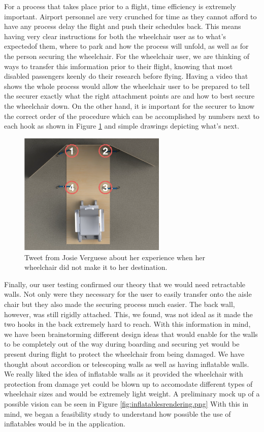 For a process that takes place prior to a flight, time efficiency is extremely important. Airport personnel are very crunched for time as they cannot afford to have any process delay the flight and push their schedules back. This means having very clear instructions for both the wheelchair user as to what's expectedof them, where to park and how the process will unfold, as well as for the person securing the wheelchair. For the wheelchair user, we are thinking of ways to transfer this imformation prior to their flight, knowing that most disabled passengers keenly do their research before flying. Having a video that shows the whole process would allow the wheelchair user to be prepared to tell the securer exactly what the right attachment points are and how to best secure the wheelchair down. On the other hand, it is important for the securer to know the correct order of the procedure which can be accomplished by numbers next to each hook as shown in Figure \ref{fig:instructionsstorage.png} and simple drawings depicting what's next. 

\begin{figure}[h]
  \centering
     \includegraphics[width=7cm]{images/instructionsstorage.png}
   \caption{Tweet from Josie Verguese about her experience when her wheelchair did not make it to her destination.}
  \label{fig:instructionsstorage.png}
\end{figure}

Finally, our user testing confirmed our theory that we would need retractable walls. Not only were they necessary for the user to easily transfer onto the aisle chair but they also made the securing process much easier. The back wall, however, was still rigidly attached. This, we found, was not ideal as it made the two hooks in the back extremely hard to reach. With this information in mind, we have been brainstorming different design ideas that would enable for the walls to be completely out of the way during boarding and securing yet would be present during flight to protect the wheelchair from being damaged. We have thought about accordion or telescoping walls as well as having inflatable walls. We really liked the idea of inflatable walls as it provided the wheelchair with protection from damage yet could be blown up to accomodate different types of wheelchair sizes and would be extremely light weight. A preliminary mock up of a possible vision can be seen in Figure \ref{fig:inflatablesrendering.png} With this in mind, we began a feasibility study to understand how possible the use of inflatables would be in the application. 


